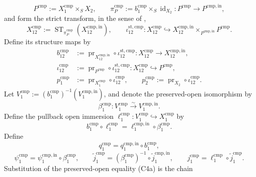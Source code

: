 \begin{definition}
\[    P^{\mathrm{cmp}}:=X_1^{\mathrm{cmp}}\times_SX_2,\qquad
    \pi_P^{\mathrm{cmp}}:=b_1^{\mathrm{cmp}}\times_S
      \operatorname{id}_{X_2}\colon P^{\mathrm{cmp}}\to P^{\mathrm{cmp,in}},
  \]
  and form the strict transform, in the sense of
  ,
  \[
    X_{12}^{\mathrm{cmp}}
      :=\operatorname{ST}_{\pi_P^{\mathrm{cmp}}}
          (X_{12}^{\mathrm{cmp,in}}),
    \qquad
    \iota_{12}^{\mathrm{st,cmp}}\colon X_{12}^{\mathrm{cmp}}
      \hookrightarrow
      X_{12}^{\mathrm{cmp,in}}\times_{P^{\mathrm{cmp,in}}}P^{\mathrm{cmp}}.
                                                                    \tag{C2}
  \]
  Define its structure maps by
  \[
  \begin{aligned}
    b_{12}^{\mathrm{cmp}}
      &:=\operatorname{pr}_{X_{12}^{\mathrm{cmp,in}}}
          \circ\iota_{12}^{\mathrm{st,cmp}}
        \colon X_{12}^{\mathrm{cmp}}\to X_{12}^{\mathrm{cmp,in}},\\
    \iota_{12}^{\mathrm{cmp}}
      &:=\operatorname{pr}_{P^{\mathrm{cmp}}}
          \circ\iota_{12}^{\mathrm{st,cmp}}
        \colon X_{12}^{\mathrm{cmp}}\hookrightarrow P^{\mathrm{cmp}},\\
    p_1^{\mathrm{cmp}}
      &:=\operatorname{pr}_{X_1^{\mathrm{cmp}}}\circ
          \iota_{12}^{\mathrm{cmp}},\qquad
    p_2^{\mathrm{cmp}}
      :=\operatorname{pr}_{X_2}\circ\iota_{12}^{\mathrm{cmp}}.
  \end{aligned}                                                     \tag{C3}
  \]
  Let
  $V_1^{\mathrm{cmp}}:=(b_1^{\mathrm{cmp}})^{-1}
    (V_1^{\mathrm{cmp,in}})$, and denote the preserved-open isomorphism by
  \[
    \beta_1^{\mathrm{cmp}}\colon V_1^{\mathrm{cmp}}
      \xrightarrow{\sim}V_1^{\mathrm{cmp,in}}.                    \tag{C4}
  \]
  Define the pullback open immersion
  $\ell_1^{\mathrm{cmp}}\colon V_1^{\mathrm{cmp}}
    \hookrightarrow X_1^{\mathrm{cmp}}$ by
  \[
    b_1^{\mathrm{cmp}}\circ\ell_1^{\mathrm{cmp}}
      =\ell_1^{\mathrm{cmp,in}}\circ\beta_1^{\mathrm{cmp}}.        \tag{C4a}
  \]
  Define
  \[
    q_1^{\mathrm{cmp}}=q_1^{\mathrm{cmp,in}}\circ b_1^{\mathrm{cmp}},
  \]
  \[
    \psi_1^{\mathrm{cmp}}
      =\psi_1^{\mathrm{cmp,in}}\circ\beta_1^{\mathrm{cmp}},\qquad
    \widetilde j_1^{\mathrm{cmp}}
      =(\beta_1^{\mathrm{cmp}})^{-1}
        \circ\widetilde j_1^{\mathrm{cmp,in}},
    \qquad
    j_1^{\mathrm{cmp}}
      =\ell_1^{\mathrm{cmp}}\circ\widetilde j_1^{\mathrm{cmp}}.
  \]
  Substitution of the preserved-open equality (C4a) is the chain
  \[
  \begin{aligned}

\end{aligned}\]
\end{definition}
